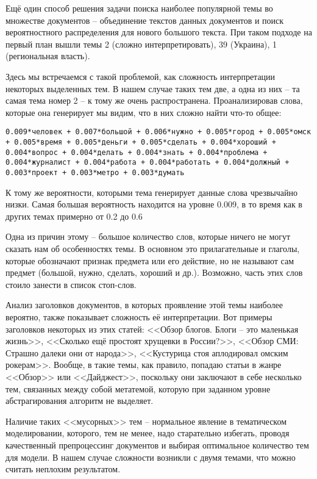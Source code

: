 Ещё один способ решения задачи поиска наиболее популярной темы во множестве документов -- объединение текстов данных документов и поиск вероятностного распределения для нового большого текста. При таком подходе на первый план вышли темы 2 (сложно интерпретировать), 39 (Украина), 1 (региональная власть).

Здесь мы встречаемся с такой проблемой, как сложность интерпретации некоторых выделенных тем. В нашем случае таких тем две, а одна из них -- та самая тема номер 2 -- к тому же очень распространена. Проанализировав слова, которые она генерирует мы видим, что в них сложно найти что-то общее:

\texttt{0.009*человек + 0.007*большой + 0.006*нужно + 0.005*город + 0.005*омск + 0.005*время + 0.005*деньги + 0.005*сделать + 0.004*хороший + 0.004*вопрос + 0.004*делать + 0.004*знать + 0.004*проблема + 0.004*журналист + 0.004*работа + 0.004*работать + 0.004*должный + 0.003*проект + 0.003*метро + 0.003*думать}

К тому же вероятности, которыми тема генерирует данные слова чрезвычайно низки. Самая большая вероятность находится на уровне 0.009, в то время как в других темах примерно от 0.2 до 0.6

Одна из причин этому -- большое количество слов, которые ничего не могут сказать нам об особенностях темы. В основном это прилагательные и глаголы, которые обозначают признак предмета или его действие, но не называют сам предмет (большой, нужно, сделать, хороший и др.). Возможно, часть этих слов стоило занести в список стоп-слов.

Анализ заголовков документов, в которых проявление этой темы наиболее вероятно, также показывает сложность её интерпретации. Вот примеры заголовков некоторых из этих статей: <<Обзор блогов. Блоги – это маленькая жизнь>>, <<Сколько ещё простоят хрущевки в России?>>, <<Обзор СМИ: Страшно далеки они от народа>>, <<Кустурица стоя аплодировал омским рокерам>>. Вообще, в такие темы, как правило, попадаю статьи в жанре <<Обзор>> или <<Дайджест>>, поскольку они заключают в себе несколько тем, связанных между собой метатемой, которую при заданном уровне абстрагирования алгоритм не выделяет.

Наличие таких <<мусорных>> тем -- нормальное явление в тематическом моделировании, которого, тем не менее, надо старательно избегать, проводя качественный препроцессинг документов и выбирая оптимальное количество тем для модели. В нашем случае сложности возникли с двумя темами, что можно считать неплохим результатом.

